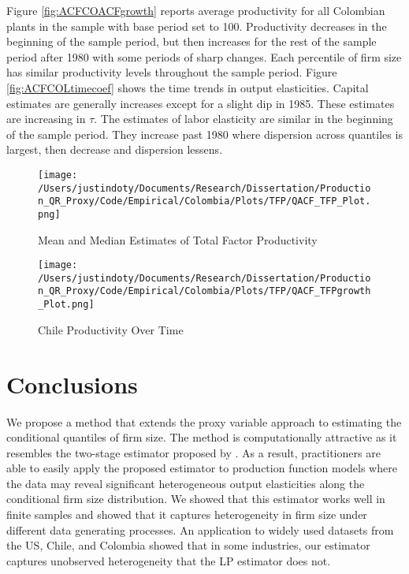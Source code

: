 \documentclass[11pt]{article}
\begin{document}
Figure \ref{fig:ACFCOACFgrowth} reports average productivity for all Colombian plants in the sample with base period set to 100. Productivity decreases in the beginning of the sample period, but then increases for the rest of the sample period after 1980 with some periods of sharp changes. Each percentile of firm size has similar productivity levels throughout the sample period. Figure \ref{fig:ACFCOLtimecoef} shows the time trends in output elasticities. Capital estimates are generally increases except for a slight dip in 1985. These estimates are increasing in $\tau$. The estimates of labor elasticity are similar in the beginning of the sample period. They increase past 1980 where dispersion across quantiles is largest, then decrease and dispersion lessens.

\begin{figure}[H]
\centering
\caption{Mean and Median Estimates of Total Factor Productivity}
\texttt{[image: /Users/justindoty/Documents/Research/Dissertation/Production\_QR\_Proxy/Code/Empirical/Colombia/Plots/TFP/QACF\_TFP\_Plot.png]}
\label{fig:ACFCOLTFPDens}
\end{figure}

\begin{figure}[H]
\centering
\caption{Chile Productivity Over Time}
\texttt{[image: /Users/justindoty/Documents/Research/Dissertation/Production\_QR\_Proxy/Code/Empirical/Colombia/Plots/TFP/QACF\_TFPgrowth\_Plot.png]}
\label{fig:ACFCOLpgrowth}
\end{figure}

\section{Conclusions} \label{conclusion}

We propose a method that extends the proxy variable approach to estimating the conditional quantiles of firm size. The method is computationally attractive as it resembles the two-stage estimator proposed by \cite{Canay2011}. As a result, practitioners are able to easily apply the proposed estimator to production function models where the data may reveal significant heterogeneous output elasticities along the conditional firm size distribution. We showed that this estimator works well in finite samples and showed that it captures heterogeneity in firm size under different data generating processes. An application to widely used datasets from the US, Chile, and Colombia showed that in some industries, our estimator captures unobserved heterogeneity that the LP estimator does not.
\end{document}
